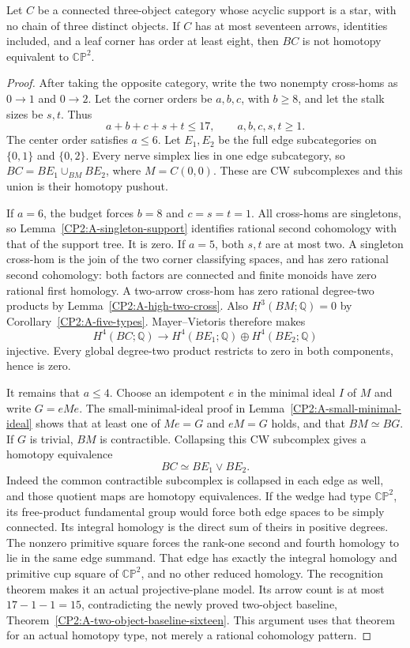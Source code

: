 \begin{proposition}
\label{CP2:A-star-large-leaf}
Let $C$ be a connected three-object category whose acyclic support
is a star, with no chain of three distinct objects. If $C$ has at
most seventeen arrows, identities included, and a leaf corner has
order at least eight, then $BC$ is not homotopy equivalent to
$\mathbb{CP}^2$.
\end{proposition}
\begin{proof}
After taking the opposite category, write the two nonempty cross-homs
as $0\to1$ and $0\to2$. Let the corner orders be $a,b,c$, with
$b\geq8$, and let the stalk sizes be $s,t$. Thus
\[
 a+b+c+s+t\leq17,\qquad a,b,c,s,t\geq1.
\]
The center order satisfies $a\leq6$. Let $E_1,E_2$ be the full
edge subcategories on $\{0,1\}$ and $\{0,2\}$. Every nerve simplex
lies in one edge subcategory, so $BC=BE_1\cup_{BM}BE_2$, where
$M=C(0,0)$. These are CW subcomplexes and this union is their
homotopy pushout.

If $a=6$, the budget forces $b=8$ and $c=s=t=1$. All cross-homs
are singletons, so Lemma~\ref{CP2:A-singleton-support} identifies
rational second cohomology with that of the support tree. It is
zero. If $a=5$, both $s,t$ are at most two. A singleton cross-hom
is the join of the two corner classifying spaces, and has zero
rational second cohomology: both factors are connected and finite
monoids have zero rational first homology. A two-arrow cross-hom
has zero rational degree-two products by
Lemma~\ref{CP2:A-high-two-cross}. Also $H^3(BM;\mathbb Q)=0$ by
Corollary~\ref{CP2:A-five-types}. Mayer--Vietoris therefore makes
\[
 H^4(BC;\mathbb Q)\longrightarrow
 H^4(BE_1;\mathbb Q)\oplus H^4(BE_2;\mathbb Q)
\]
injective. Every global degree-two product restricts to zero in
both components, hence is zero.

It remains that $a\leq4$. Choose an idempotent $e$ in the minimal
ideal $I$ of $M$ and write $G=eMe$. The small-minimal-ideal proof
in Lemma~\ref{CP2:A-small-minimal-ideal} shows that at least one
of $Me=G$ and $eM=G$ holds, and that $BM\simeq BG$.
If $G$ is trivial, $BM$ is contractible. Collapsing this CW
subcomplex gives a homotopy equivalence
\[
 BC\simeq BE_1\vee BE_2.
\]
Indeed the common contractible subcomplex is collapsed in each
edge as well, and those quotient maps are homotopy equivalences.
If the wedge had type $\mathbb{CP}^2$, its free-product fundamental
group would force both edge spaces to be simply connected. Its
integral homology is the direct sum of theirs in positive degrees.
The nonzero primitive square forces the rank-one second and fourth
homology to lie in the same edge summand. That edge has exactly
the integral homology and primitive cup square of $\mathbb{CP}^2$,
and no other reduced homology. The recognition theorem makes it
an actual projective-plane model. Its arrow count is at most
$17-1-1=15$, contradicting the newly proved two-object baseline,
Theorem~\ref{CP2:A-two-object-baseline-sixteen}. This argument uses
that theorem for an actual homotopy type, not merely a rational
cohomology pattern.


\end{proof}
